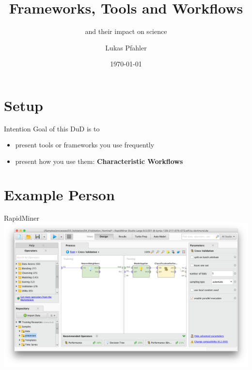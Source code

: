 \documentclass[aspectratio=169,10pt]{beamer}
\title{Frameworks, Tools and Workflows}
\subtitle{and their impact on science}
\date{\today}
\author{Lukas Pfahler}
\institute{TU Dortmund University, Chair for Artificial Intelligence}
\begin{document}
\maketitle
\section{Setup}
\begin{frame}{Intention}
Goal of this DuD is to
\begin{itemize}
    \item present tools or frameworks you use frequently
    \item present how you use them: \textbf{Characteristic Workflows}
\end{itemize}
\end{frame}
\section{Example Person}
\begin{frame}[fragile]{RapidMiner}
\includegraphics[width=\linewidth]{rapidminer.png}
\end{frame}
\end{document}
